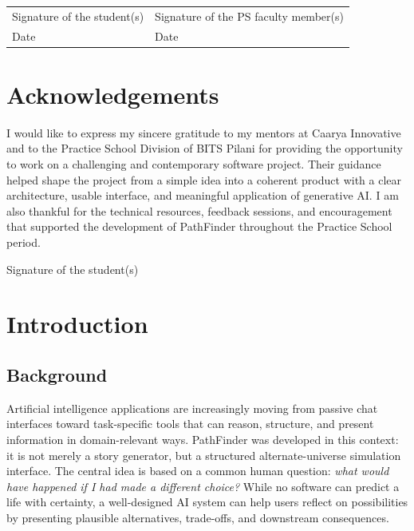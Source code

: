 \documentclass[12pt,a4paper]{report}
\begin{document}
\noindent
\begin{tabular}{@{}p{}p{}@{}}
Signature of the student(s) & Signature of the PS faculty member(s) \\[1cm]
Date & Date
\end{tabular}

\chapter*{Acknowledgements}
\par\noindent
I would like to express my sincere gratitude to my mentors at Caarya Innovative and to the Practice School Division of BITS Pilani for providing the opportunity to work on a challenging and contemporary software project. Their guidance helped shape the project from a simple idea into a coherent product with a clear architecture, usable interface, and meaningful application of generative AI. I am also thankful for the technical resources, feedback sessions, and encouragement that supported the development of PathFinder throughout the Practice School period.
\vspace{2cm}

\noindent
Signature of the student(s)

\tableofcontents
\listoffigures
\listoftables

\chapter{Introduction}

\section{Background}
Artificial intelligence applications are increasingly moving from passive chat interfaces toward task-specific tools that can reason, structure, and present information in domain-relevant ways. PathFinder was developed in this context: it is not merely a story generator, but a structured alternate-universe simulation interface. The central idea is based on a common human question: \textit{what would have happened if I had made a different choice?} While no software can predict a life with certainty, a well-designed AI system can help users reflect on possibilities by presenting plausible alternatives, trade-offs, and downstream consequences.
\end{document}
